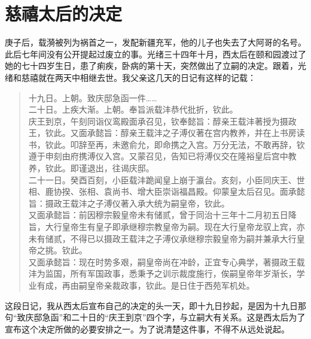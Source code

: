 \fancyhead[RO]{} %
\fancyhead[LE]{} %
\chapter*{慈禧太后的决定}
\thispagestyle{empty}
庚子后，载漪被列为祸首之一，发配新疆充军，他的儿子也失去了大阿哥的名号。此后七年间没有公开提起过废立的事。光绪三十四年十月，西太后在颐和园渡过了她的七十四岁生日，患了痢疾，卧病的第十天，突然做出了立嗣的决定。跟着，光绪和慈禧就在两天中相继去世。我父亲这几天的日记有这样的记载：\\

\begin{quote}
	十九日。上朝。致庆邸急函一件……\\

二十日。上疾大渐。上朝。奉旨派载沣恭代批折，钦此。\\

庆王到京，午刻同诣仪鸾殿面承召见，钦奉懿旨：醇亲王载沣著授为摄政王，钦此。又面承懿旨：醇亲王载沣之子溥仪著在宫内教养，并在上书房读书，钦此。叩辞至再，未邀俞允，即命携之入宫。万分无法，不敢再辞，钦遵于申刻由府携溥仪入宫。又蒙召见，告知已将溥仪交在隆裕皇后宫中教养，钦此。即谨退出，往谒庆邸。\\

二十一日。癸酉百刻，小臣载沣跪闻皇上崩于瀛台。亥刻，小臣同庆王、世相、鹿协揆、张相、袁尚书、增大臣崇诣福昌殿。仰蒙皇太后召见。面承懿旨：摄政王载沣之子溥仪著入承大统为嗣皇帝，钦此。\\

又面承懿旨：前因穆宗毅皇帝未有储贰，曾于同治十三年十二月初五日降旨，大行皇帝生有皇子即承继穆宗教皇帝为嗣。现在大行皇帝龙驭上宾，亦未有储贰，不得已以摄政王载沣之子溥仪承继穆宗毅皇帝为嗣并兼承大行皇帝之挑。钦此。\\

又面承懿旨：现在时势多艰，嗣皇帝尚在冲龄，正宜专心典学，著摄政王载沣为监国，所有军国政事，悉秉予之训示裁度施行，俟嗣皇帝年岁渐长，学业有成，再由嗣皇帝亲裁政事，钦此。是日住于西苑军机处。\\
\end{quote}

这段日记，我从西太后宣布自己的决定的头一天，即十九日抄起，是因为十九日那句“致庆邸急函”和二十日的“庆王到京”四个字，与立嗣大有关系。这是西太后为了宣布这个决定所做的必要安排之一。为了说清楚这件事，不得不从远处说起。\\

